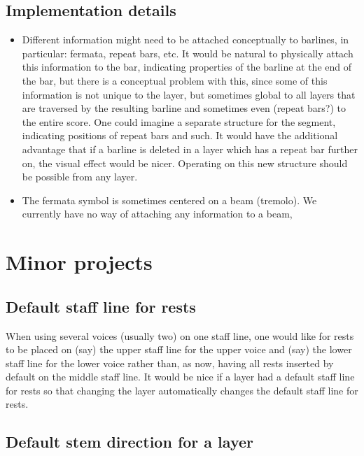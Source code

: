 \subsection{Implementation details}

\begin{itemize}
\item Different information might need to be attached conceptually to
  barlines, in particular: fermata, repeat bars, etc.  It would be
  natural to physically attach this information to the bar, indicating
  properties of the barline at the end of the bar, but there is a
  conceptual problem with this, since some of this information is not
  unique to the layer, but sometimes global to all layers that are
  traversed by the resulting barline and sometimes even (repeat bars?)
  to the entire score.  One could imagine a separate structure for the
  segment, indicating positions of repeat bars and such.  It would
  have the additional advantage that if a barline is deleted in a
  layer which has a repeat bar further on, the visual effect would be
  nicer.  Operating on this new structure should be possible from any
  layer. 
\item The fermata symbol is sometimes centered on a beam (tremolo).
  We currently have no way of attaching any information to a beam,  
\end{itemize}

\section{Minor projects}

\subsection{Default staff line for rests}

When using several voices (usually two) on one staff line, one would
like for rests to be placed on (say) the upper staff line for the
upper voice and (say) the lower staff line for the lower voice rather
than, as now, having all rests inserted by default on the middle staff
line.  It would be nice if a layer had a default staff line for rests
so that changing the layer automatically changes the default staff
line for rests.  

\subsection{Default stem direction for a layer}

